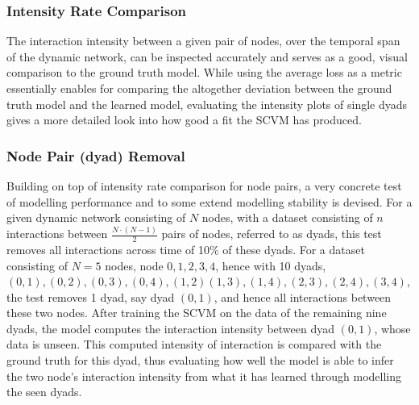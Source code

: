 \subsubsection{Intensity Rate Comparison}
\label{sec:Method:Evaluation:Intensity}
The interaction intensity between a given pair of nodes, over the temporal span of the dynamic network, can be inspected accurately and serves as a good, visual comparison to the ground truth model. 
While using the average loss as a metric essentially enables for comparing the altogether deviation between the ground truth model and the learned model, evaluating the intensity plots of single dyads gives a more detailed look into how good a fit the SCVM has produced.


\subsubsection{Node Pair (dyad) Removal}
\label{sec:Method:Evaluation:NodePairRemoval}
Building on top of intensity rate comparison for node pairs, a very concrete test of modelling performance and to some extend modelling stability is devised.
For a given dynamic network consisting of $N$ nodes, with a dataset consisting of $n$ interactions between $\frac{N\cdot(N-1)}{2}$ pairs of nodes, referred to as dyads, this test removes all interactions across time of 10\% of these dyads.
For a dataset consisting of $N = 5$ nodes, node $0,1,2,3,4$, hence with 10 dyads, $(0,1), (0,2), (0,3), (0,4), (1,2) (1,3), (1,4), (2,3), (2,4), (3,4)$, the test removes 1 dyad, say dyad $(0,1)$, and hence all interactions between these two nodes.
After training the SCVM on the data of the remaining nine dyads, the model computes the interaction intensity between dyad $(0,1)$, whose data is unseen.
This computed intensity of interaction is compared with the ground truth for this dyad, thus evaluating how well the model is able to infer the two node's interaction intensity from what it has learned through modelling the seen dyads.


